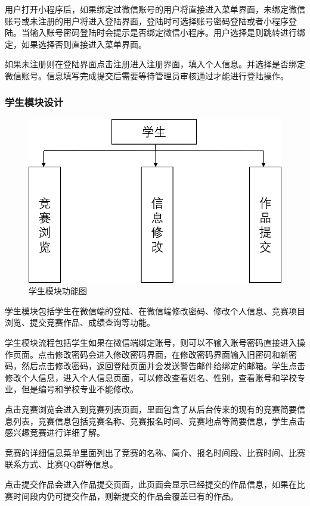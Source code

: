 \documentclass[a4paper]{ltxdoc}
\begin{document}
{		用户打开小程序后，如果绑定过微信账号的用户将直接进入菜单界面，未绑定微信账号或未注册的用户将进入登陆界面，登陆时可选择账号密码登陆或者小程序登陆。当输入账号密码登陆时会提示是否绑定微信小程序。用户选择是则跳转进行绑定，如果选择否则直接进入菜单界面。
		
		如果未注册则在登陆界面点击注册进入注册界面，填入个人信息。并选择是否绑定微信账号。信息填写完成提交后需要等待管理员审核通过才能进行登陆操作。
	
		\subsubsection{学生模块设计}
		\begin{figure}[H]
			\centering
			\includegraphics[width=0.7\linewidth]{images/1-2.png}
			\caption{学生模块功能图}
		\end{figure}
		学生模块包括学生在微信端的登陆、在微信端修改密码、修改个人信息、竞赛项目浏览、提交竞赛作品、成绩查询等功能。
		
		学生模块流程包括学生如果在微信端绑定账号，则可以不输入账号密码直接进入操作页面。点击修改密码会进入修改密码界面，在修改密码界面输入旧密码和新密码，然后点击修改密码，返回登陆页面并会发送警告邮件给绑定的邮箱。学生点击修改个人信息，进入个人信息页面，可以修改查看姓名、性别，查看账号和学校专业，但是编号和学校专业不能修改。
		
		点击竞赛浏览会进入到竞赛列表页面，里面包含了从后台传来的现有的竞赛简要信息列表，竞赛信息包括竞赛名称、竞赛报名时间、竞赛地点等简要信息，学生点击感兴趣竞赛进行详细了解。
		
		竞赛的详细信息菜单里面列出了竞赛的名称、简介、报名时间段、比赛时间、比赛联系方式、比赛QQ群等信息。
		
		点击提交作品会进入作品提交页面，此页面会显示已经提交的作品信息，如果在比赛时间段内仍可提交作品，则新提交的作品会覆盖已有的作品。
		
}
\end{document}

